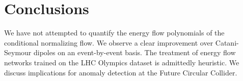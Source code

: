 \section{Conclusions}\label{sec:conclusions}

We have not attempted to quantify the energy flow polynomials of the
conditional normalizing flow. We observe a clear improvement over
Catani-Seymour dipoles on an event-by-event basis. The treatment of
energy flow networks trained on the LHC Olympics dataset is admittedly
heuristic. We discuss implications for anomaly detection at the Future
Circular Collider.

